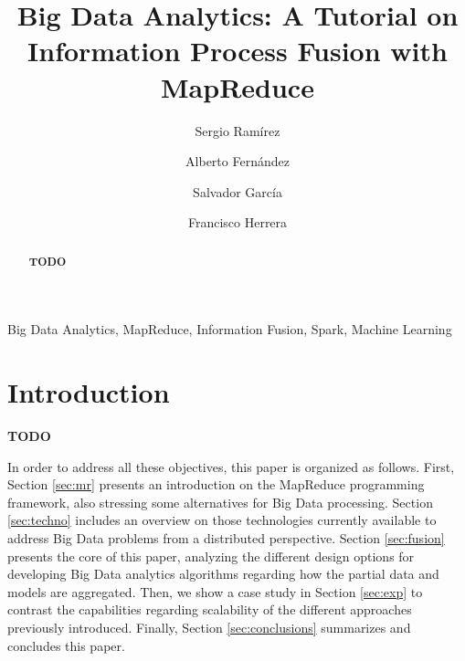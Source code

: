 \documentclass[3p,review]{elsarticle}
\newcommand{\TODO}{\textbf{TODO}}
\begin{document}
\begin{frontmatter}

\title{Big Data Analytics: A Tutorial on Information Process Fusion with MapReduce}

\author[grx]{Sergio Ram\'irez}

\author[grx]{Alberto Fern\'andez}

\author[grx]{Salvador Garc\'ia}

\author[grx]{Francisco Herrera}

\address[grx]{Department of Computer Science and Artificial Intelligence, University of Granada, Granada, Spain}



\begin{abstract}

\TODO


\end{abstract}

\begin{keyword}
Big Data Analytics, MapReduce, Information Fusion, Spark, Machine Learning
\end{keyword}

\end{frontmatter}

\section{Introduction}\label{sec:intro}

\TODO

In order to address all these objectives, this paper is organized as follows. First, Section \ref{sec:mr} presents an introduction on the MapReduce programming framework, also stressing some alternatives for Big Data processing. Section \ref{sec:techno} includes an overview on those technologies currently available to address Big Data problems from a distributed perspective. Section \ref{sec:fusion} presents the core of this paper, analyzing the different design options for developing Big Data analytics algorithms regarding how the partial data and models are aggregated. Then, we show a case study in Section \ref{sec:exp} to contrast the capabilities regarding scalability of the different approaches previously introduced. Finally, Section \ref{sec:conclusions} summarizes and concludes this paper.
\end{document}
